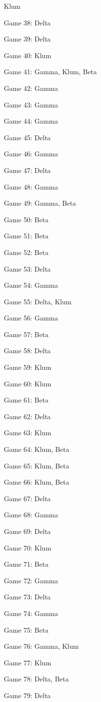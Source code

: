 \documentclass{article}
\begin{document}
\begin{multicols}{3}
\begin{compactitem}
Klum
\item Game 38:
Delta
\item Game 39:
Delta
\item Game 40:
Klum
\item Game 41:
Gamma, Klum, Beta
\item Game 42:
Gamma
\item Game 43:
Gamma
\item Game 44:
Gamma
\item Game 45:
Delta
\item Game 46:
Gamma
\item Game 47:
Delta
\item Game 48:
Gamma
\item Game 49:
Gamma, Beta
\item Game 50:
Beta
\item Game 51:
Beta
\item Game 52:
Beta
\item Game 53:
Delta
\item Game 54:
Gamma
\item Game 55:
Delta, Klum
\item Game 56:
Gamma
\item Game 57:
Beta
\item Game 58:
Delta
\item Game 59:
Klum
\item Game 60:
Klum
\item Game 61:
Beta
\item Game 62:
Delta
\item Game 63:
Klum
\item Game 64:
Klum, Beta
\item Game 65:
Klum, Beta
\item Game 66:
Klum, Beta
\item Game 67:
Delta
\item Game 68:
Gamma
\item Game 69:
Delta
\item Game 70:
Klum
\item Game 71:
Beta
\item Game 72:
Gamma
\item Game 73:
Delta
\item Game 74:
Gamma
\item Game 75:
Beta
\item Game 76:
Gamma, Klum
\item Game 77:
Klum
\item Game 78:
Delta, Beta
\item Game 79:
Delta

\end{compactitem}
\end{multicols}
\end{document}
